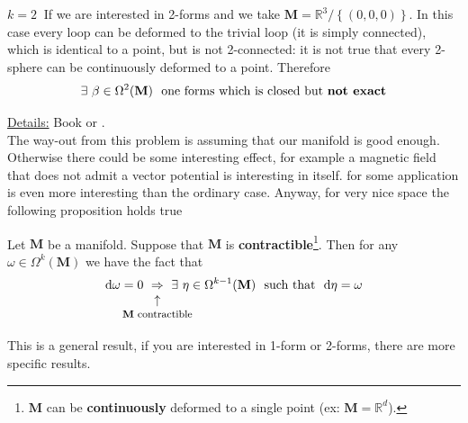 \documentclass[../main.tex]{subfiles}
\begin{document}
\begin{example}
$\boxed{k=2}\ $ If we are interested in 2-forms and we take $\mathbf{M}=\mathbb{R}^3\slash \left\{\left(0,0,0\right)\right\}$. In this case every loop can be deformed to the trivial loop (it is simply connected), which is identical to a point, but is not 2-connected: it is not true that every 2-sphere can be continuously deformed to a point. Therefore
\[\exists \ \beta \in \Omega^2(\mathbf{M})\ \textrm{ one forms which is closed but \textbf{not exact}}\]
\end{example}
\underline{Details:} Book  or \cite{doCarmo1994}.\\
The way-out from this problem is assuming that our manifold is good enough. Otherwise there could be some interesting effect, for example a magnetic field that does not admit a vector potential is interesting in itself. for some application is even more interesting than the ordinary case. Anyway, for very nice space the following proposition holds true
\begin{proposition}
Let $\mathbf{M}$ be a manifold. Suppose that $\mathbf{M}$ is \textbf{contractible}\footnote{$\mathbf{M}$ can be \textbf{continuously} deformed to a single point (ex: $\mathbf{M}=\mathbb{R}^d$).}. Then for any $\omega\in\Omega^k(\mathbf{M})$ we have the fact that
\[
\textrm{d}\omega=0 \ \underset{\mathclap{\tikz \node {$\uparrow$} node [below=1ex] {\footnotesize $\mathbf{M}$ contractible };}}{\Rightarrow} \ \exists \ \eta\in\Omega^{k-1}(\mathbf{M}) \ \textrm{ such that } \ \textrm{d}\eta = \omega
\]
\end{proposition}
This is a general result, if you are interested in 1-form or 2-forms, there are more specific results.
\end{document}
